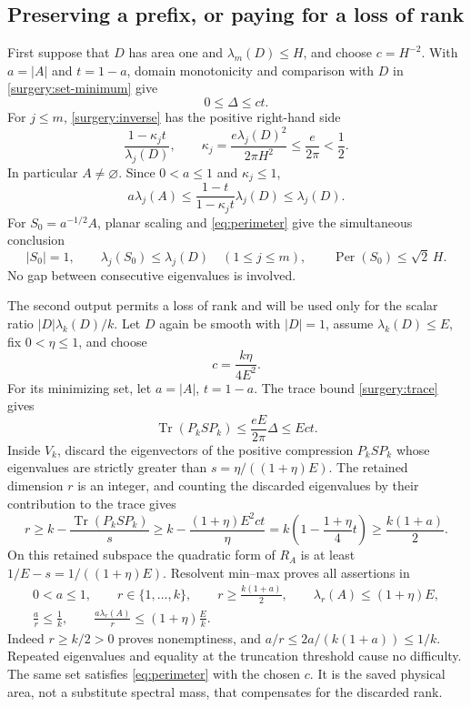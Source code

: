 \documentclass[11pt,reqno]{amsart}
\numberwithin{equation}{section}
\newcommand{\abs}[1]{\lvert#1\rvert}
\begin{document}
\subsection{Preserving a prefix, or paying for a loss of rank}
\label{surgery:two-outputs}

First suppose that \(D\) has area one and
\(\lambda_m(D)\le H\), and choose \(c=H^{-2}\).
With \(a=\abs A\) and \(t=1-a\), domain monotonicity and comparison
with \(D\) in \eqref{surgery:set-minimum} give
\[
 0\le\Delta\le ct.
\]
For \(j\le m\), \eqref{surgery:inverse} has the positive right-hand
side
\[
 \frac{1-\kappa_jt}{\lambda_j(D)},\qquad
 \kappa_j=\frac{e\lambda_j(D)^2}{2\pi H^2}
 \le\frac e{2\pi}<\frac12.
\]
In particular \(A\ne\varnothing\).  Since \(0<a\le1\) and
\(\kappa_j\le1\),
\[
 a\lambda_j(A)
 \le \frac{1-t}{1-\kappa_jt}\lambda_j(D)
 \le\lambda_j(D).
\]
For \(S_0=a^{-1/2}A\), planar scaling and
\eqref{eq:perimeter} give the simultaneous conclusion
\begin{equation}
 \abs{S_0}=1,\qquad
 \lambda_j(S_0)\le\lambda_j(D)\quad(1\le j\le m),\qquad
 \operatorname{Per}(S_0)\le\sqrt2\,H.
 \label{surgery:prefix}
\end{equation}
No gap between consecutive eigenvalues is involved.

The second output permits a loss of rank and will be used only for
the scalar ratio \(\abs D\lambda_k(D)/k\).
Let \(D\) again be smooth with \(\abs D=1\), assume
\(\lambda_k(D)\le E\), fix \(0<\eta\le1\), and choose
\[
 c=\frac{k\eta}{4E^2}.
\]
For its minimizing set, let \(a=\abs A\), \(t=1-a\).
The trace bound \eqref{surgery:trace} gives
\[
 \operatorname{Tr}(P_kSP_k)
 \le\frac{eE}{2\pi}\Delta\le Ect.
\]
Inside \(V_k\), discard the eigenvectors of the positive compression
\(P_kSP_k\) whose eigenvalues are strictly greater than
\(s=\eta/((1+\eta)E)\).  The retained dimension \(r\) is an integer,
and counting the discarded eigenvalues by their contribution to
the trace gives
\[
 r\ge k-\frac{\operatorname{Tr}(P_kSP_k)}s
 \ge k-\frac{(1+\eta)E^2ct}{\eta}
 =k\left(1-\frac{1+\eta}{4}t\right)
 \ge\frac{k(1+a)}2.
\]
On this retained subspace the quadratic form of \(R_A\) is at least
\(1/E-s=1/((1+\eta)E)\).  Resolvent min--max proves all assertions
in
\begin{equation}
 \begin{gathered}
  0<a\le1,\qquad r\in\{1,\ldots,k\},\qquad
  r\ge\frac{k(1+a)}2,\qquad
  \lambda_r(A)\le(1+\eta)E,\\
  \frac ar\le\frac1k,\qquad
  \frac{a\lambda_r(A)}r\le(1+\eta)\frac Ek.
 \end{gathered}
 \label{eq:trace-rank}
\end{equation}
Indeed \(r\ge k/2>0\) proves nonemptiness, and
\(a/r\le2a/(k(1+a))\le1/k\).
Repeated eigenvalues and equality at the truncation threshold cause
no difficulty.  The same set satisfies \eqref{eq:perimeter} with
the chosen \(c\).  It is the saved physical area, not a substitute
spectral mass, that compensates for the discarded rank.
\end{document}
